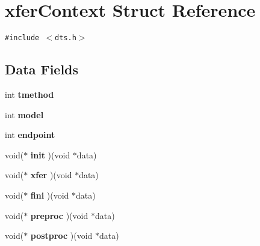 \hypertarget{structxferContext}{
\section{xferContext Struct Reference}
\label{structxferContext}
}
{\tt \#include $<$dts.h$>$}

\subsection*{Data Fields}
\begin{CompactItemize}
\item 
\hypertarget{structxferContext_5a017bea9575bd5243e88beb7a3ac2f8}{
int \textbf{tmethod}}
\label{structxferContext_5a017bea9575bd5243e88beb7a3ac2f8}

\item 
\hypertarget{structxferContext_d830c08108db126995a403863e559658}{
int \textbf{model}}
\label{structxferContext_d830c08108db126995a403863e559658}

\item 
\hypertarget{structxferContext_a846ef06e5823bc61e0213dc85d3f241}{
int \textbf{endpoint}}
\label{structxferContext_a846ef06e5823bc61e0213dc85d3f241}

\item 
\hypertarget{structxferContext_49c3670262a09bbe1d64638bfbd7b16c}{
void($\ast$ \textbf{init} )(void $\ast$data)}
\label{structxferContext_49c3670262a09bbe1d64638bfbd7b16c}

\item 
\hypertarget{structxferContext_6d83baf5b98b1b29d12de31a20a9b93d}{
void($\ast$ \textbf{xfer} )(void $\ast$data)}
\label{structxferContext_6d83baf5b98b1b29d12de31a20a9b93d}

\item 
\hypertarget{structxferContext_9259de4c54fcaf1288286ae3553f69cd}{
void($\ast$ \textbf{fini} )(void $\ast$data)}
\label{structxferContext_9259de4c54fcaf1288286ae3553f69cd}

\item 
\hypertarget{structxferContext_a243018ef2a3093609d5f3b47d7ae33c}{
void($\ast$ \textbf{preproc} )(void $\ast$data)}
\label{structxferContext_a243018ef2a3093609d5f3b47d7ae33c}

\item 
\hypertarget{structxferContext_7d763993603d2df20c36b5af792e4a7f}{
void($\ast$ \textbf{postproc} )(void $\ast$data)}
\label{structxferContext_7d763993603d2df20c36b5af792e4a7f}


\end{CompactItemize}
